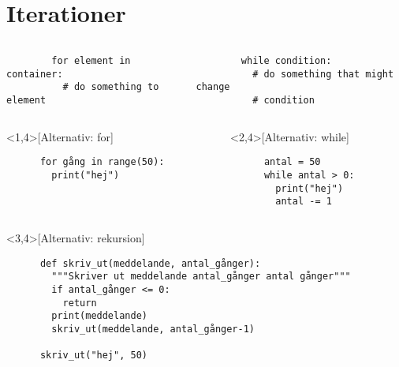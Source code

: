 \begin{frame}[fragile]
  \begin{example}[Gåexemplet]
    \inputminted[firstline=32]{python}{examples/walk.py}
  \end{example}
\end{frame}


\section{Iterationer}

\begin{frame}[fragile]
  \begin{columns}[t]
    \begin{column}{0.45\columnwidth}
      \begin{verbatim}
        for element in container:
          # do something to element
      \end{verbatim}
    \end{column}
    \begin{column}{0.55\columnwidth}
      \begin{verbatim}
        while condition:
          # do something that might change
          # condition
      \end{verbatim}
    \end{column}
  \end{columns}
\end{frame}

\begin{frame}[fragile]
  \begin{columns}[t]
    \begin{column}{0.5\columnwidth}
  \begin{example}<1,4>[Alternativ: for]
    \begin{verbatim}
      for gång in range(50):
        print("hej")
    \end{verbatim}
  \end{example}
    \end{column}

    \begin{column}{0.5\columnwidth}
  \begin{example}<2,4>[Alternativ: while]
    \begin{verbatim}
      antal = 50
      while antal > 0:
        print("hej")
        antal -= 1
    \end{verbatim}
  \end{example}
    \end{column}
  \end{columns}

  \begin{example}<3,4>[Alternativ: rekursion]
    \begin{verbatim}
      def skriv_ut(meddelande, antal_gånger):
        """Skriver ut meddelande antal_gånger antal gånger"""
        if antal_gånger <= 0:
          return
        print(meddelande)
        skriv_ut(meddelande, antal_gånger-1)

      skriv_ut("hej", 50)
    \end{verbatim}
  \end{example}
\end{frame}

